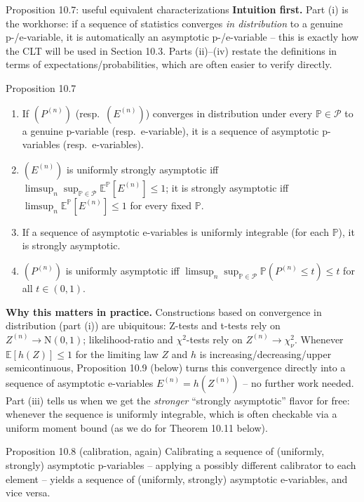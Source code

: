 \documentclass[aspectratio=169,10pt]{beamer}
\newcommand{\E}{\mathbb{E}}
\newcommand{\Pb}{\mathbb{P}}
\newcommand{\calP}{\mathcal{P}}
\begin{document}
\begin{frame}[allowframebreaks]{Proposition 10.7: useful equivalent characterizations}
  \textbf{Intuition first.} Part (i) is the workhorse: if a sequence of statistics converges \emph{in distribution} to a genuine p-/e-variable, it is automatically an asymptotic p-/e-variable -- this is exactly how the CLT will be used in Section 10.3. Parts (ii)--(iv) restate the definitions in terms of expectations/probabilities, which are often easier to verify directly.
  \begin{block}{Proposition 10.7}
    \begin{enumerate}
      \item If $(P^{(n)})$ (resp.\ $(E^{(n)})$) converges in distribution under every $\Pb\in\calP$ to a genuine p-variable (resp.\ e-variable), it is a sequence of asymptotic p-variables (resp.\ e-variables).
      \item $(E^{(n)})$ is uniformly strongly asymptotic iff $\displaystyle \limsup_n \sup_{\Pb\in\calP} \E^{\Pb}[E^{(n)}] \leq 1$; it is strongly asymptotic iff $\limsup_n \E^{\Pb}[E^{(n)}]\leq1$ for every fixed $\Pb$.
      \item If a sequence of asymptotic e-variables is uniformly integrable (for each $\Pb$), it is strongly asymptotic.
      \item $(P^{(n)})$ is uniformly asymptotic iff $\limsup_n \sup_{\Pb\in\calP}\Pb(P^{(n)}\leq t)\leq t$ for all $t\in(0,1)$.
    \end{enumerate}
  \end{block}

  \framebreak

  \textbf{Why this matters in practice.} Constructions based on convergence in distribution (part (i)) are ubiquitous: Z-tests and t-tests rely on $Z^{(n)} \to \mathrm{N}(0,1)$; likelihood-ratio and $\chi^2$-tests rely on $Z^{(n)} \to \chi^2_\nu$. Whenever $\E[h(Z)]\leq1$ for the limiting law $Z$ and $h$ is increasing/decreasing/upper semicontinuous, Proposition 10.9 (below) turns this convergence directly into a sequence of asymptotic e-variables $E^{(n)}=h(Z^{(n)})$ -- no further work needed. Part (iii) tells us when we get the \emph{stronger} ``strongly asymptotic'' flavor for free: whenever the sequence is uniformly integrable, which is often checkable via a uniform moment bound (as we do for Theorem 10.11 below).

  \begin{block}{Proposition 10.8 (calibration, again)}
    Calibrating a sequence of (uniformly, strongly) asymptotic p-variables -- applying a possibly different calibrator to each element -- yields a sequence of (uniformly, strongly) asymptotic e-variables, and vice versa.
  \end{block}
\end{frame}
\end{document}
